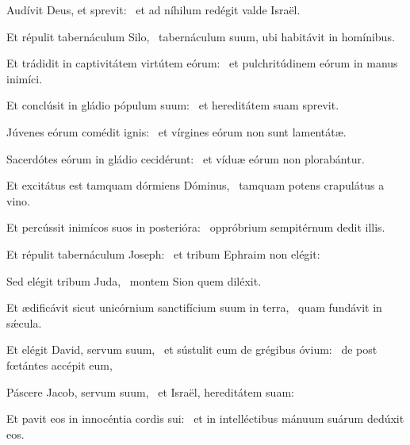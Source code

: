 
\item Audívit Deus, et sprevit:~\psstar{} et ad níhilum redégit valde Israël.

\item Et répulit tabernáculum Silo,~\psstar{} tabernáculum suum, ubi habitávit in homínibus.

\item Et trádidit in captivitátem virtútem eórum:~\psstar{} et pulchritúdinem eórum in manus inimíci.

\item Et conclúsit in gládio pópulum suum:~\psstar{} et hereditátem suam sprevit.

\item Júvenes eórum comédit ignis:~\psstar{} et vírgines eórum non sunt lamentátæ.

\item Sacerdótes eórum in gládio cecidérunt:~\psstar{} et víduæ eórum non plorabántur.

\item Et excitátus est tamquam dórmiens Dóminus,~\psstar{} tamquam potens crapulátus a vino.

\item Et percússit inimícos suos in posterióra:~\psstar{} oppróbrium sempitérnum dedit illis.

\item Et répulit tabernáculum Joseph:~\psstar{} et tribum Ephraim non elégit:

\item Sed elégit tribum Juda,~\psstar{} montem Sion quem diléxit.

\item Et ædificávit sicut unicórnium sanctifícium suum in terra,~\psstar{} quam fundávit in sǽcula.

\item Et elégit David, servum suum,~\pscross{} et sústulit eum de grégibus óvium:~\psstar{} de post fœtántes accépit eum,

\item Páscere Jacob, servum suum,~\psstar{} et Israël, hereditátem suam:

\item Et pavit eos in innocéntia cordis sui:~\psstar{} et in intelléctibus mánuum suárum dedúxit eos.